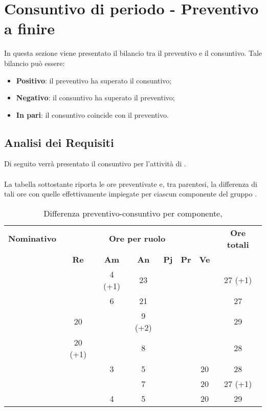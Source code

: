 \section{Consuntivo di periodo - Preventivo a finire}
In questa sezione viene presentato il bilancio tra il preventivo e il consuntivo. Tale bilancio può essere:
\begin{itemize}
	\item \textbf{Positivo}: il preventivo ha superato il consuntivo;
	\item \textbf{Negativo}: il consuntivo ha superato il preventivo;
	\item \textbf{In pari}: il consuntivo coincide con il preventivo.
\end{itemize}

\subsection{Analisi dei Requisiti}
Di seguito verrà presentato il consuntivo per l'attività di \textit{\AdR}.
\\\\
La tabella sottostante riporta le ore preventivate e, tra parentesi, la differenza di tali ore con quelle effettivamente impiegate per ciascun componente del gruppo \gruppo.

\begin{table}[H]
	\begin{center}
		\begin{tabular}{|c|c|c|c|c|c|c|c|}
			\hline
			\textbf{Nominativo} & \multicolumn{6}{c|}{\textbf{Ore per ruolo}} & \textbf{Ore totali} \\
			& \textbf{Re} & \textbf{Am} & \textbf{An} & \textbf{Pj} & \textbf{Pr} & \textbf{Ve} & \\
			\hline	
			\FB		&			&	4 (+1)	&	23		&		&		&		&	27 (+1)	\\
			\hline
			\AF		&			&	6 		&	21		&	 	&		&		& 	27		\\
			\hline
			\GN		&	20		&			&	9 (+2)	&		&		&		&	29		\\
			\hline
			\GR		&	20 (+1)	&	 		&	8 		&		&	 	& 		&	28		\\
			\hline
			\SM 	&			&	3		&	5		&		&		& 	20	&	28		\\
			\hline
			\MP		& 			&			&	7		&		&		&	20	&	27 (+1)	\\
			\hline
			\MV 	&			&	4		&	5		&		&		&	20	& 	29		\\
			\hline
		\end{tabular}
	\end{center}
	\caption{Differenza preventivo-consuntivo per componente, \AdR}
\end{table}

